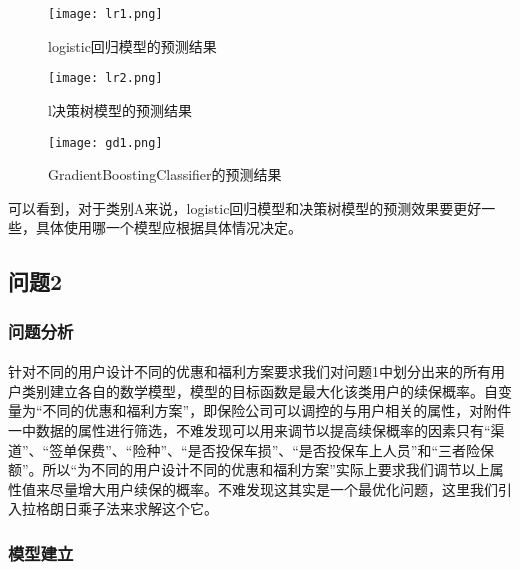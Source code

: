 \documentclass[a4paper]{article}
\begin{document}
				\begin{figure}[H]	
					\centering
					\texttt{[image: lr1.png]}
					\caption{logistic回归模型的预测结果}
				\end{figure}
				\begin{figure}[H]	
					\centering
					\texttt{[image: lr2.png]}
					\caption{l决策树模型的预测结果}
				\end{figure}
				\begin{figure}[H]	
					\centering
					\texttt{[image: gd1.png]}
					\caption{GradientBoostingClassifier的预测结果}
				\end{figure}
			可以看到，对于类别A来说，logistic回归模型和决策树模型的预测效果要更好一些，具体使用哪一个模型应根据具体情况决定。
	\subsection{问题2}
		\subsubsection{问题分析}
			\paragraph{}针对不同的用户设计不同的优惠和福利方案要求我们对问题1中划分出来的所有用户类别建立各自的数学模型，模型的目标函数是最大化该类用户的续保概率。自变量为“不同的优惠和福利方案”，即保险公司可以调控的与用户相关的属性，对附件一中数据的属性进行筛选，不难发现可以用来调节以提高续保概率的因素只有“渠道”、“签单保费”、“险种”、“是否投保车损”、“是否投保车上人员”和“三者险保额”。所以“为不同的用户设计不同的优惠和福利方案”实际上要求我们调节以上属性值来尽量增大用户续保的概率。不难发现这其实是一个最优化问题，这里我们引入拉格朗日乘子法来求解这个它。
		\subsubsection{模型建立}
\end{document}
